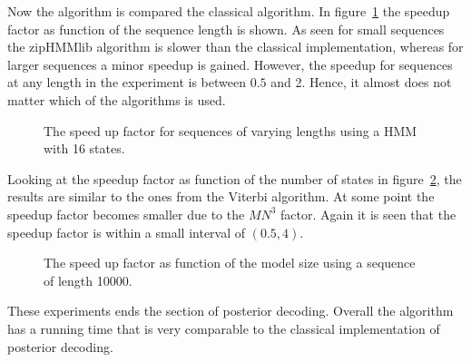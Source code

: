 Now the algorithm is compared the classical algorithm. In
figure~\ref{fig:posterior_speedup_vs_sequence_length} the speedup factor as
function of the sequence length is shown. As seen for small sequences the
zipHMMlib algorithm is slower than the classical implementation, whereas for
larger sequences a minor speedup is gained. However, the speedup for sequences
at any length in the experiment is between $0.5$ and 2. Hence, it almost does
not matter  which of the algorithms is used.

\begin{figure}
  \centering
  
  \caption{The speed up factor for sequences of varying lengths using a HMM
    with 16 states.}
  \label{fig:posterior_speedup_vs_sequence_length}
\end{figure}

Looking at the speedup factor as function of the number of states in
figure~\ref{fig:posterior_speedup_vs_k}, the results are similar to the ones
from the Viterbi algorithm. At some point the speedup factor becomes smaller
due to the $M N^3$ factor. Again it is seen that the speedup factor is within a
small interval of $(0.5, 4)$.

\begin{figure}
  \centering
  
  \caption{The speed up factor as function of the model size using a sequence
    of length 10000.}
  \label{fig:posterior_speedup_vs_k}
\end{figure}

These experiments ends the section of posterior decoding. Overall the algorithm
has a running time that is very comparable to the classical implementation of
posterior decoding.



